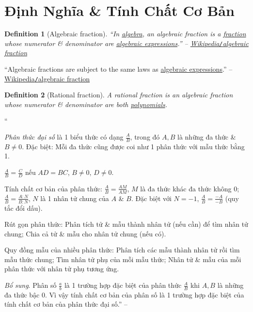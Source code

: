 \documentclass{article}
\numberwithin{equation}{section}
\newtheorem{definition}{Definition}[section]
\begin{document}
\section*{Định Nghĩa \& Tính Chất Cơ Bản}

\begin{definition}[Algebraic fraction]
	``In \href{https://en.wikipedia.org/wiki/Algebra}{algebra}, an \emph{algebraic fraction} is a \href{https://en.wikipedia.org/wiki/Fraction_(mathematics)}{fraction} whose numerator \& denominator are \href{https://en.wikipedia.org/wiki/Algebraic_expression}{algebraic expressions}.'' -- \href{https://en.wikipedia.org/wiki/Algebraic_fraction}{Wikipedia\emph{\texttt{/}}algebraic fraction}
\end{definition}
``Algebraic fractions are subject to the same laws as \href{https://en.wikipedia.org/wiki/Arithmetic_fraction}{algebraic expressions}.'' -- \href{https://en.wikipedia.org/wiki/Algebraic_fraction}{Wikipedia\texttt{/}algebraic fraction}

\begin{definition}[Rational fraction]
	A \emph{rational fraction} is an algebraic fraction whose numerator \& denominator are both \href{https://en.wikipedia.org/wiki/Polynomial}{polynomials}.
\end{definition}
``\begin{enumerate*}
	\item[\textbf{1.}] \textit{Phân thức đại số} là 1 biểu thức có dạng $\frac{A}{B}$, trong đó $A,B$ là những đa thức \& $B\ne 0$. Đặc biệt: Mỗi đa thức cũng được coi như 1 phân thức với mẫu thức bằng 1.
	\item[\textbf{2.}] $\frac{A}{B} = \frac{C}{D}$ nếu $AD = BC$, $B\ne 0$, $D\ne 0$.
	\item[\textbf{3.}] Tính chất cơ bản của phân thức: $\frac{A}{B} = \frac{AM}{AM}$, $M$ là đa thức khác đa thức không 0; $\frac{A}{B} = \frac{A:N}{B:N}$, $N$ là 1 nhân tử chung của $A$ \& $B$. Đặc biệt với $N = -1$, $\frac{A}{B} = \frac{-A}{-B}$ (quy tắc đổi dấu).
	\item[\textbf{4.}] Rút gọn phân thức: Phân tích tử \& mẫu thành nhân tử (nếu cần) để tìm nhân tử chung; Chia cả tử \& mẫu cho nhân tử chung (nếu có).
	\item[\textbf{5.}] Quy đồng mẫu của nhiều phân thức: Phân tích các mẫu thành nhân tử rồi tìm mẫu thức chung; Tìm nhân tử phụ của mỗi mẫu thức; Nhân tử \& mẫu của mỗi phân thức với nhân tử phụ tương ứng.
\end{enumerate*}

\textit{Bổ sung}. Phân số $\frac{a}{b}$ là 1 trường hợp đặc biệt của phân thức $\frac{A}{B}$ khi $A,B$ là những đa thức bậc 0. Vì vậy tính chất cơ bản của phân số là 1 trường hợp đặc biệt của tính chất cơ bản của phân thức đại số.'' -- \cite[pp. 37--38]{Tuyen_Toan_8}
\end{document}
